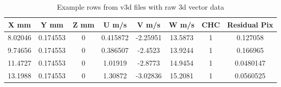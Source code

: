 \begin{table}[H]
\begin{center}
\begin{tabular}{|cccccccc|}
	\hline
	X mm & Y mm  & Z mm & U m/s & V m/s & W m/s & CHC & Residual Pix\\
	\hline
	8.02046 & 0.174553 & 0 & 0.415872 & -2.25951 & 13.5873 & 1 & 0.127058\\
	9.74656 & 0.174553 & 0 & 0.386507 & -2.4523 & 13.9244 & 1 & 0.166965\\
	11.4727 & 0.174553 & 0 & 1.01919 & -2.8773 & 14.9454 & 1 & 0.0480147\\
	13.1988 & 0.174553 & 0 & 1.30872 & -3.02836 & 15.2081 & 1 & 0.0560525\\
	\hline
\end{tabular}
\caption{Example rows from v3d files with raw 3d vector data}
\label{table:v3d_row_example}
\end{center}
\end{table}
